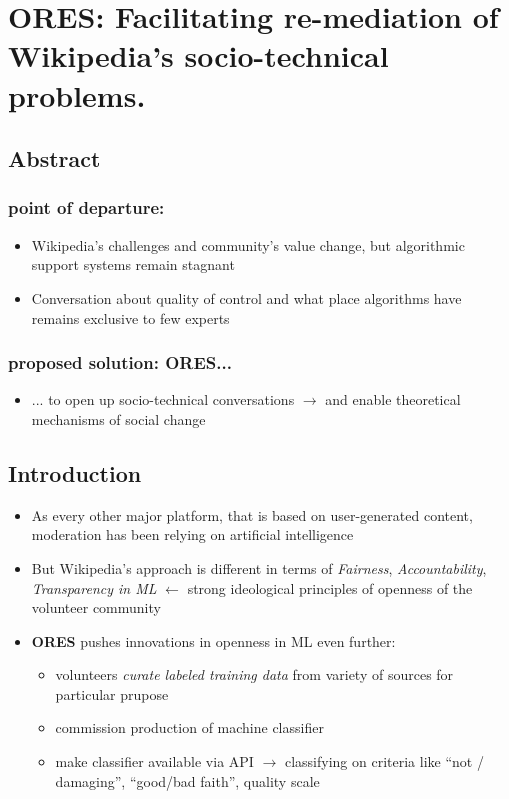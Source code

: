 \documentclass[12pt,a4paper]{article}
\begin{document}
\section{ORES: Facilitating re-mediation of Wikipedia’s socio-technical problems.}
\subsection{Abstract}
\subsubsection{point of departure:}
\begin{itemize}
\item Wikipedia's challenges and community's value change, but algorithmic support systems remain stagnant
\item Conversation about quality of control and what place algorithms have remains exclusive to few experts
\end{itemize}
\subsubsection{proposed solution: ORES...}
\begin{itemize}
\item ... to open up socio-technical conversations
\(\rightarrow\) and enable theoretical mechanisms of social change
\end{itemize}
\subsection{Introduction}
\begin{itemize}
\item As every other major platform, that is based on user-generated content, moderation has been relying on artificial intelligence
\item But Wikipedia's approach is different in terms of \textit{Fairness}, \textit{Accountability}, \textit{Transparency in ML}
\(\leftarrow\) strong ideological principles of openness of the volunteer community
\item \textbf{ORES} pushes innovations in openness in ML even further:
\begin{itemize}
\item volunteers \textit{curate labeled training data} from variety of sources for particular prupose
\item commission production of machine classifier
\item make classifier available via API
\(\rightarrow\) classifying on criteria like ``not / damaging'', ``good/bad faith'', quality scale
\end{itemize}
\end{itemize}
\end{document}
